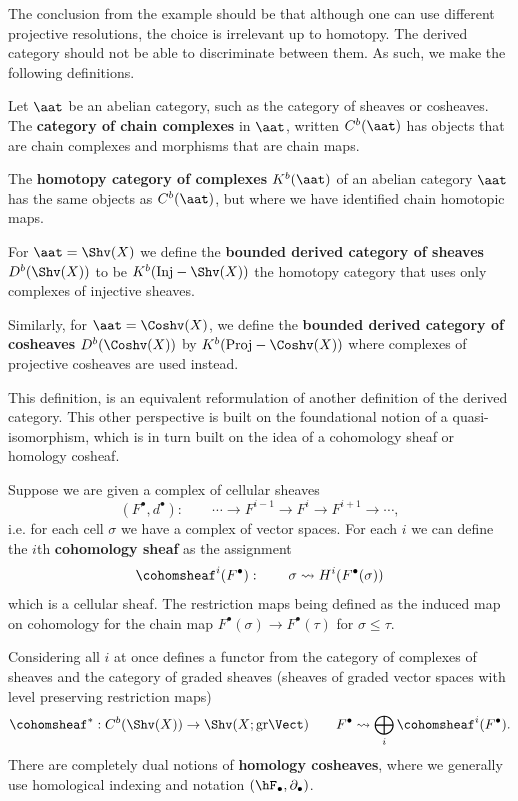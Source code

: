 The conclusion from the example should be that although one can use different projective resolutions, the choice is irrelevant up to homotopy. The derived category should not be able to discriminate between them. As such, we make the following definitions.

\begin{defn}
	Let $\aat$ be an abelian category, such as the category of sheaves or cosheaves. The \textbf{category of chain complexes} in $\aat$, written $C^b(\aat)$ has objects that are chain complexes and morphisms that are chain maps.
	
	The \textbf{homotopy category of complexes} $K^b(\aat)$ of an abelian category $\aat$ has the same objects as $C^b(\aat)$, but where we have identified chain homotopic maps.
\end{defn}

\begin{defn}
	For $\aat=\Shv(X)$ we define the \textbf{bounded derived category of sheaves} $D^b(\Shv(X))$ to be $K^b(\mathrm{Inj}-\Shv(X))$ the homotopy category that uses only complexes of injective sheaves. 
	
	Similarly, for $\aat=\Coshv(X)$, we define the \textbf{bounded derived category of cosheaves} $D^b(\Coshv(X))$ by $K^b(\mathrm{Proj}-\Coshv(X))$ where complexes of projective cosheaves are used instead.
\end{defn}

This definition, is an equivalent reformulation of another definition of the derived category. This other perspective is built on the foundational notion of a quasi-isomorphism, which is in turn built on the idea of a cohomology sheaf or homology cosheaf.

\begin{defn}
	Suppose we are given a complex of cellular sheaves
	\[
		(F^{\bullet},d^{\bullet}): \qquad \cdots \to F^{i-1} \to F^{i} \to F^{i+1} \to \cdots,
	\]
	i.e. for each cell $\sigma$ we have a complex of vector spaces. For each $i$ we can define the $i$th \textbf{cohomology sheaf} as the assignment
	\[
		\cohomsheaf^i(F^{\bullet}): \qquad \sigma \rightsquigarrow H^i(F^{\bullet}(\sigma))
	\]
	which is a cellular sheaf. The restriction maps being defined as the induced map on cohomology for the chain map $F^{\bullet}(\sigma)\to F^{\bullet}(\tau)$ for $\sigma\leq\tau$. 
	
	Considering all $i$ at once defines a functor from the category of complexes of sheaves and the category of graded sheaves (sheaves of graded vector spaces with level preserving restriction maps)
	\[
		\cohomsheaf^*: C^b(\Shv(X))\to \Shv(X;\mathrm{gr}\Vect) \qquad F^{\bullet} \rightsquigarrow \bigoplus_i \cohomsheaf^i(F^{\bullet}).
	\]
	There are completely dual notions of \textbf{homology cosheaves}, where we generally use homological indexing and notation $(\hF_{\bullet},\partial_{\bullet})$.
\end{defn}

